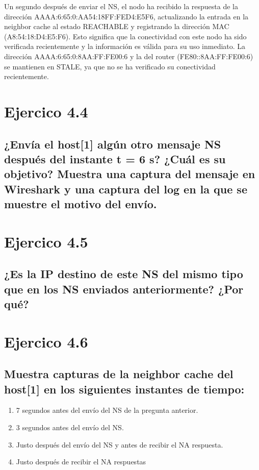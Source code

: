 \begin{enumerate}
    Un segundo después de enviar el NS, el nodo ha recibido la respuesta de la dirección AAAA:6:65:0:AA54:18FF:FED4:E5F6, actualizando la entrada en la neighbor cache al estado REACHABLE y registrando la dirección MAC (A8:54:18:D4:E5:F6). Esto significa que la conectividad con este nodo ha sido verificada recientemente y la información es válida para su uso inmediato. La dirección AAAA:6:65:0:8AA:FF:FE00:6 y la del router (FE80::8AA:FF:FE00:6) se mantienen en STALE, ya que no se ha verificado su conectividad recientemente.

\end{enumerate}



\section{Ejercico 4.4}
\subsection{¿Envía el host[1] algún otro mensaje NS después del instante t = 6 s? ¿Cuál es su objetivo? Muestra una captura del mensaje en Wireshark y una captura del log en la que se muestre el motivo del envío.}


\section{Ejercico 4.5}
\subsection{¿Es la IP destino de este NS del mismo tipo que en los NS enviados anteriormente? ¿Por qué?}


\section{Ejercico 4.6}
\subsection{Muestra capturas de la neighbor cache del host[1] en los siguientes instantes de tiempo:}

\begin{enumerate}
    \item 7 segundos antes del envío del NS de la pregunta anterior.
    
    \item 3 segundos antes del envío del NS.
    \item Justo después del envío del NS y antes de recibir el NA respuesta.
    \item Justo después de recibir el NA respuestas
\end{enumerate}
